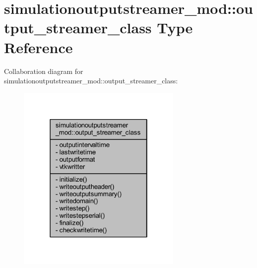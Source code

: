 \hypertarget{structsimulationoutputstreamer__mod_1_1output__streamer__class}{}\section{simulationoutputstreamer\+\_\+mod\+:\+:output\+\_\+streamer\+\_\+class Type Reference}
\label{structsimulationoutputstreamer__mod_1_1output__streamer__class}


Collaboration diagram for simulationoutputstreamer\+\_\+mod\+:\+:output\+\_\+streamer\+\_\+class\+:\nopagebreak
\begin{figure}[H]
\begin{center}
\leavevmode
\includegraphics[width=226pt]{structsimulationoutputstreamer__mod_1_1output__streamer__class__coll__graph}
\end{center}
\end{figure}
